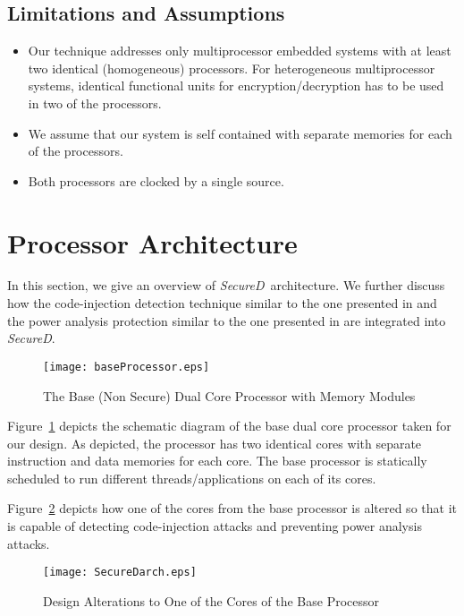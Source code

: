 \documentclass{article}
\newcommand{\SecureD}{\emph{SecureD}}
\begin{document}
\subsection{Limitations and Assumptions}
\begin{itemize} 
 \item Our  technique addresses only multiprocessor embedded systems
       with at least two identical (homogeneous) processors. For heterogeneous multiprocessor systems,
       identical functional units for encryption/decryption has to be used in two of the processors. \item We  assume that our system is self contained with    separate
       memories for each of the processors.
 \item Both processors are clocked by a single source.
\end{itemize}


\section{Processor Architecture} \label{arch}
In this section, we give an overview of \SecureD\ architecture.    We
further discuss how the code-injection detection technique similar to
the  one  presented  in \cite{ragel06impres} and  the  power analysis
protection  similar  to  the one presented in \cite{ambrose2011multiprocessor}
are integrated into \SecureD.

\begin{figure}[ht!]
\centering
\texttt{[image: baseProcessor.eps]}
\caption{The Base (Non Secure) Dual Core Processor with Memory Modules}
\label{baseprocessor}
\end{figure}

Figure~\ref{baseprocessor} depicts  the schematic diagram of the base
dual core processor taken for our design. As depicted, the  processor
has two identical cores with separate instruction and data   memories
for each core. The  base  processor  is statically scheduled to   run
different threads/applications on each of its cores. 

Figure~\ref{SecureDarch}  depicts  how one of the cores from the base
processor  is altered so that it is      capable of detecting  code-injection attacks and preventing power analysis attacks. 

\begin{figure}[hb!]
\centering
\texttt{[image: SecureDarch.eps]}
\caption{Design Alterations to One of the Cores of the Base Processor}
\label{SecureDarch}
\end{figure}
\end{document}
